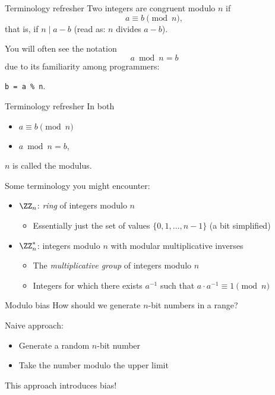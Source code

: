 \begin{frame}{Terminology refresher}
  Two integers are \alert{congruent} modulo $n$ if
  \[
    a \equiv b \pmod{n},
  \]
  \pause
  that is, if $n \mid a - b$ (read as: $n$ divides $a-b$).

  \vspace*{1em}

  \pause
  You will often see the notation
  \[
    a \bmod n = b
  \]
  due to its familiarity among programmers:
  \begin{center}
    \texttt{b = a \% n}.
  \end{center}
\end{frame}

\begin{frame}{Terminology refresher}
  In both
  \begin{itemize}
    \item $a \equiv b \pmod{n}$ 
    \item $a \bmod n = b$,
  \end{itemize}
  $n$ is called the \alert{modulus}.

  Some terminology you might encounter:
  \begin{itemize}[<+(1)->]
    \item $\ZZ_n$: \emph{ring} of integers modulo $n$
    \begin{itemize}
      \item Essentially just the set of values $\{0, 1, \dots, n-1\}$ (a bit simplified)
    \end{itemize}
    \item $\ZZ_n^*$: integers modulo $n$ with modular multiplicative inverses
    \begin{itemize}
      \item The \emph{multiplicative group} of integers modulo $n$
      \item Integers for which there exists $a^{-1}$ such that $a\cdot a^{-1} \equiv 1 \pmod{n}$
    \end{itemize}
  \end{itemize}
\end{frame}

\begin{frame}{Modulo bias}
  How should we generate $n$-bit numbers in a range?

  \pause
  Naive approach:
  \begin{itemize}[<+(1)->]
    \item Generate a random $n$-bit number
    \item Take the number modulo the upper limit
  \end{itemize}

  \pause
  This approach introduces bias!
\end{frame}

